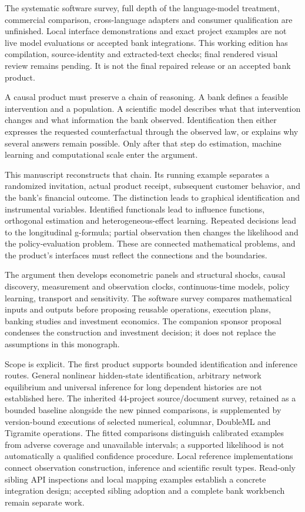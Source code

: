 \documentclass[11pt,a4paper,openany]{book}
\begin{document}
The systematic software survey, full depth of the language-model treatment,
commercial comparison, cross-language adapters and consumer qualification are
unfinished. Local interface demonstrations and exact project examples are not
live model evaluations or accepted bank integrations. This working edition has
compilation, source-identity and extracted-text checks; final rendered visual
review remains pending. It is not the final repaired release or an accepted
bank product.


A causal product must preserve a chain of reasoning. A bank defines a feasible
intervention and a population. A scientific model describes what that
intervention changes and what information the bank observed. Identification
then either expresses the requested counterfactual through the observed law,
or explains why several answers remain possible. Only after that step do
estimation, machine learning and computational scale enter the argument.

This manuscript reconstructs that chain. Its running example separates a
randomized invitation, actual product receipt, subsequent customer behavior,
and the bank's financial outcome. The distinction leads to graphical
identification and instrumental variables. Identified functionals lead to
influence functions, orthogonal estimation and heterogeneous-effect learning.
Repeated decisions lead to the longitudinal g-formula; partial observation
then changes the likelihood and the policy-evaluation problem. These are
connected mathematical problems, and the product's interfaces must reflect
the connections and the boundaries.

The argument then develops econometric panels and structural shocks,
causal discovery, measurement and observation clocks, continuous-time
models, policy learning, transport and sensitivity. The software survey
compares mathematical inputs and outputs before proposing reusable
operations, execution plans, banking studies and investment economics.
The companion sponsor proposal condenses the construction and investment
decision; it does not replace the assumptions in this monograph.

Scope is explicit. The first product supports bounded identification and
inference routes. General nonlinear hidden-state identification, arbitrary
network equilibrium and universal inference for long dependent histories
are not established here. The inherited 44-project source/document survey, retained as a bounded
baseline alongside the new pinned comparisons, is supplemented
by version-bound executions of selected numerical, columnar, DoubleML and
Tigramite operations. The fitted comparisons distinguish calibrated examples
from adverse coverage and unavailable intervals; a supported likelihood is
not automatically a qualified confidence procedure.
Local reference implementations connect observation construction, inference
and scientific result types. Read-only sibling API inspections and local
mapping examples establish a concrete integration design; accepted sibling
adoption and a complete bank workbench remain separate work.
\end{document}
